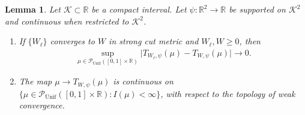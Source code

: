 \documentclass[11pt,reqno]{amsart}
\numberwithin{equation}{section}
\newtheorem{lemma}[theorem]{Lemma}
\theoremstyle{definition}
\def\R{{\mathbb R}}
\def\P{{\mathcal P}}
\def\Punif{\P_{\mathrm{Unif}}([0,1] \times \R)}
\begin{document}
\begin{lemma}\label{lem:properties}
	Let $ \mathcal{K} \subset \R$ be a compact interval.
	Let $\psi: \R^2 \to \R$ be supported on $ \mathcal{K}^2 $ and continuous when restricted to $ \mathcal{K}^2 $.
	\begin{enumerate}[(1)]
		\item If $\{W_\ell\}$ converges to $W$ in  strong cut metric and $W_\ell, W \ge 0 $, then 
		\begin{align*}
			\sup_{\mu\in \Punif}\Big|T_{W_\ell,\psi}(\mu)-T_{W,\psi}(\mu)\Big|\to 0.
		\end{align*}
		
		\item The map $\mu\to T_{W,\psi}(\mu)$ is continuous on $\{\mu\in \Punif:I(\mu)<\infty\}$, with respect to the topology of weak convergence.
	\end{enumerate}
\end{lemma}
\end{document}
